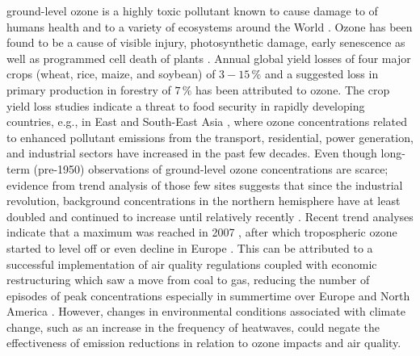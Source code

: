 \documentclass[bg, manuscript]{copernicus}
\begin{document}
\introduction  %
\label{sec:intro}

ground-level ozone is a highly toxic pollutant known to cause damage to of humans health \citep{WHO2008} and to a variety of ecosystems around the World \citep{PT:Emberson2020}. Ozone has been found to be a cause of visible injury, photosynthetic damage, early senescence as well as programmed cell death of plants \citep{PCE:Kangasjarvi2005}. Annual global yield losses of four major crops (wheat, rice, maize, and soybean) of $3-15\,\unit{\%}$ \citep{PJ:Ainsworth2017} and a suggested loss in primary production in forestry of $7\,\unit{\%}$ \citep{GCB:Wittig2009,EP:Matyssek2012} has been attributed to ozone.
The crop yield loss studies indicate a threat to food security in rapidly developing countries, e.g., in East and South-East Asia \citep{GCB:Tang2013,NCC:Tai2014,AE:Chuwah2015,GCB:Mills2018}, where ozone concentrations related to enhanced pollutant emissions from the transport, residential, power generation, and industrial sectors have increased in the past few decades. Even though long-term (pre-1950) observations of ground-level ozone concentrations are scarce; evidence from trend analysis of those few sites suggests that since the industrial revolution, background concentrations in the northern hemisphere have at least doubled and continued to increase until relatively recently \citep[Chapter 2]{IPCC2013}. Recent trend analyses indicate that a maximum was reached in 2007 \citep{AE:Derwent2018}, after which tropospheric ozone started to level off or even decline in Europe \citep{ESA:Cooper2014, ACP:Wespes2018,ESA:Gaudel2018}. This can be attributed to a successful implementation of air quality regulations coupled with economic restructuring which saw a move from coal to gas, reducing the number of episodes of peak concentrations especially in summertime over Europe and North America \citep[e.g.,][]{ESA:Fleming2018, ESA:Mills2018}. However, changes in environmental conditions associated with climate change, such as an increase in the frequency of heatwaves, could negate the effectiveness of emission reductions in relation to ozone impacts and air quality\citep{NCC:Lin2020}.
\end{document}
